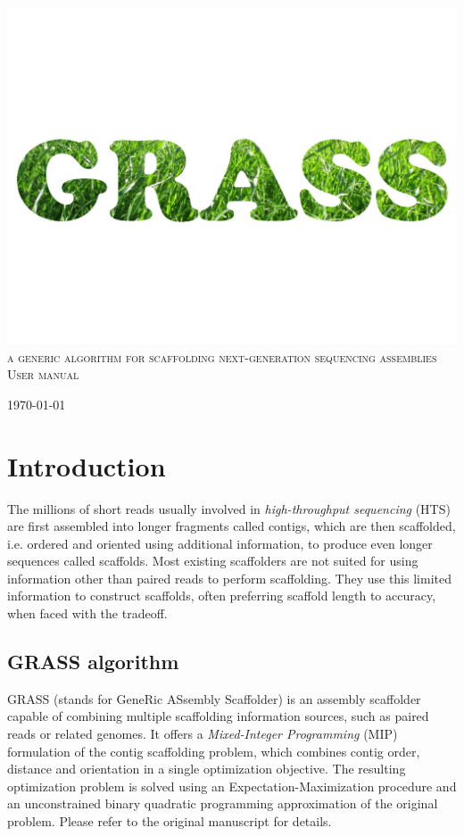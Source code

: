 \documentclass[12pt, a4paper]{report}
\begin{document}
\begin{titlepage}
\begin{center}
\includegraphics[clip=true, trim=15 200 15 200, width=\textwidth]{logo}
\\[2cm]
\textsc{\LARGE a generic algorithm for scaffolding next-generation sequencing assemblies}
\\[1.5cm]
\textsc{\Large User manual}
\\[0.5cm]

\vfill

{\large \today}
\end{center}
\end{titlepage}

\setcounter{tocdepth}{2}
\tableofcontents

\chapter{Introduction}
The millions of short reads usually involved in \emph{high-throughput sequencing} (HTS) are first assembled into longer fragments called contigs, which are then scaffolded, i.e. ordered and oriented using additional information, to produce even longer sequences called scaffolds. Most existing scaffolders are not suited for using information other than paired reads to perform scaffolding. They use this limited information to construct scaffolds, often preferring scaffold length to accuracy, when faced with the tradeoff.

\section{GRASS algorithm}
GRASS (stands for GeneRic ASsembly Scaffolder) is an assembly scaffolder capable of combining multiple scaffolding information sources, such as paired reads or related genomes. It offers a \emph{Mixed-Integer Programming} (MIP) formulation of the contig scaffolding problem, which combines contig order, distance and orientation in a single optimization objective. The resulting optimization problem is solved using an Expectation-Maximization procedure and an unconstrained binary quadratic programming approximation of the original problem. Please refer to the original  manuscript for details.
\end{document}
